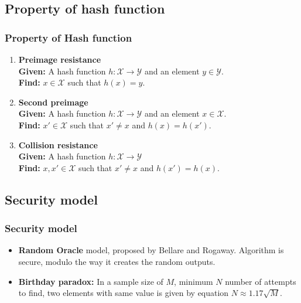 \documentclass{beamer}
\begin{document}
\subsection{Property of hash function}
\begin{frame}
  \frametitle{Property of Hash function\footnotemark}
  \begin{enumerate}
  \item {\bf Preimage resistance} \\
  {\bf Given:} A hash function $h : \mathcal{X} \to \mathcal{Y}$ and an element $y \in \mathcal{Y}$. \\
  {\bf Find:} $x \in \mathcal{X}$ such that $h(x) = y$.
  \item {\bf Second preimage} \\
  {\bf Given:} A hash function $h : \mathcal{X} \to \mathcal{Y}$ and an element $x \in \mathcal{X}$. \\
  {\bf Find:} $x' \in \mathcal{X}$ such that $x' \neq x$ and $h(x) = h(x')$.
  \item {\bf Collision resistance} \\
  {\bf Given:} A hash function $h : \mathcal{X} \to \mathcal{Y}$ \\
  {\bf Find:} $x, x' \in \mathcal{X}$ such that $x' \neq x$ and $h(x') = h(x)$. 
  \end{enumerate}
\end{frame}

\subsection{Security model}
\begin{frame}
\frametitle{Security model}
\begin{itemize}
\item {\bf Random Oracle} model, proposed by Bellare and Rogaway. Algorithm is secure, modulo the way it creates
the random outputs.\footnotemark
\item {\bf Birthday paradox:} In a sample size of $M$, minimum $N$ number of attempts to find, two elements with
same value is given by equation $N \approx 1.17 \sqrt{M}$. 
\end{itemize}
\end{frame}
\end{document}
